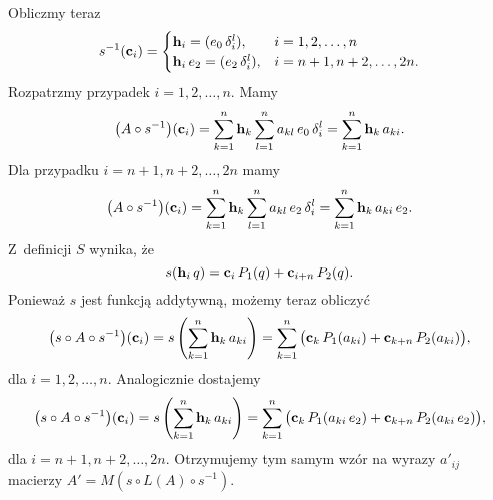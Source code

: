 \documentclass[a4paper,11pt]{article}
\begin{document}
Obliczmy teraz
\begin{equation}
  \label{eq:Wojtynski-91}
  s^{ -1 }( \mathbf{c}_{ i } ) =
  \begin{cases}
    \mathbf{h}_{ i } = ( e_{ 0 } \, \delta^{ l }_{ i } ), &i = 1, 2, \ldots, n \\
    \mathbf{h}_{ i } \, e_{ 2 } = ( e_{ 2 } \, \delta^{ l }_{ i } ),
    &i = n + 1, n + 2, \ldots, 2n.
  \end{cases}
\end{equation}
Rozpatrzmy przypadek $i = 1, 2, \ldots, n$. Mamy
\begin{equation}
  \label{eq:Wojtynski-92}
  \big( A \circ s^{ -1 } \big)( \mathbf{c}_{ i } ) =
  \sum_{ k = 1 }^{ n } \mathbf{h}_{ k } \sum_{ l = 1 }^{ n }
  a_{ k l } \, e_{ 0 } \, \delta^{ l }_{ i } =
  \sum_{ k = 1 }^{ n } \mathbf{h}_{ k } \, a_{ k i }.
\end{equation}
Dla przypadku $i = n + 1, n + 2, \ldots, 2n$ mamy
\begin{equation}
  \label{eq:Wojtynski-93}
  \big( A \circ s^{ -1 } \big)( \mathbf{c}_{ i } ) =
  \sum_{ k = 1 }^{ n } \mathbf{h}_{ k } \sum_{ l = 1 }^{ n }
  a_{ k l } \, e_{ 2 } \, \delta^{ l }_{ i } =
  \sum_{ k = 1 }^{ n } \mathbf{h}_{ k } \, a_{ k i } \, e_{ 2 }.
\end{equation}
Z~definicji $S$ wynika, że
\begin{equation}
  \label{eq:Wojtynski-94}
  s( \mathbf{h}_{ i } \, q ) =
  \mathbf{c}_{ i } \, P_{ 1 }( q ) + \mathbf{c}_{ i + n } \, P_{ 2 }( q ).
\end{equation}
Ponieważ $s$ jest funkcją addytywną, możemy teraz obliczyć
\begin{equation}
  \label{eq:Wojtynski-95}
  \big( s \circ A \circ s^{ -1 } \big)( \mathbf{c}_{ i } ) =
  s\left( \sum_{ k = 1 }^{ n } \mathbf{h}_{ k } \, a_{ k i } \right) =
  \sum_{ k = 1 }^{ n } \big( \mathbf{c}_{ k } \, P_{ 1 }( a_{ k i } )
  + \mathbf{c}_{ k + n } \, P_{ 2 }( a_{ k i } ) \big),
\end{equation}
dla $i = 1, 2, \ldots, n$. Analogicznie dostajemy
\begin{equation}
  \label{eq:Wojtynski-96}
  \big( s \circ A \circ s^{ -1 } \big)( \mathbf{c}_{ i } ) =
  s\left( \sum_{ k = 1 }^{ n } \mathbf{h}_{ k } \, a_{ k i } \right) =
  \sum_{ k = 1 }^{ n } \big( \mathbf{c}_{ k } \, P_{ 1 }( a_{ k i } \, e_{ 2 } )
  + \mathbf{c}_{ k + n } \, P_{ 2 }( a_{ k i } \, e_{ 2 } ) \big),
\end{equation}
dla $i = n + 1, n + 2, \ldots, 2n$. Otrzymujemy tym samym wzór na wyrazy
$a'_{ i j }$ macierzy $A' = M\!\left( s \circ L( A ) \circ s^{ -1 } \right)$.
\end{document}
